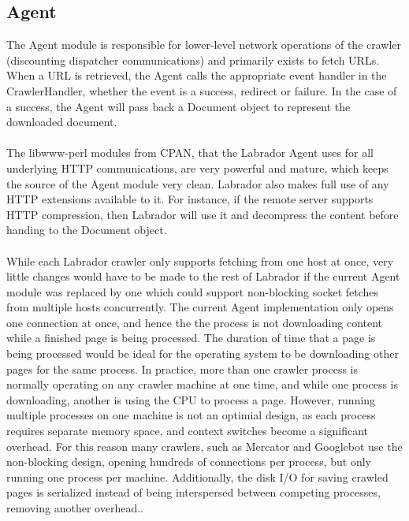 \subsection{Agent}
The Agent module is responsible for lower-level network operations of the crawler (discounting dispatcher communications) and primarily exists to fetch URLs. When a URL is retrieved, the Agent calls the appropriate event handler in the CrawlerHandler, whether the event is a success, redirect or failure. In the case of a success, the Agent will pass back a Document object to represent the downloaded document.\\
\ \\
The libwww-perl modules from CPAN\cite{site1}, that the Labrador Agent uses for all underlying HTTP communications, are very powerful and mature, which keeps the source of the Agent module very clean. Labrador also makes full use of any HTTP extensions available to it. For instance, if the remote server supports HTTP compression, then Labrador will use it and decompress the content before handing to the Document object.\\
\ \\
While each Labrador crawler only supports fetching from one host at once, very little changes would have to be made to the rest of Labrador if the current Agent module was replaced by one which could support non-blocking socket fetches from multiple hosts concurrently. The current Agent implementation only opens one connection at once, and hence the the process is not downloading content while a finished page is being processed. The duration of time that a page is being processed would be ideal for the operating system to be downloading other pages for the same process. In practice, more than one crawler process is normally operating on any crawler machine at one time, and while one process is downloading, another is using the CPU to process a page. However, running multiple processes on one machine is not an optimial design, as each process requires separate memory space, and context switches become a significant overhead. For this reason many crawlers, such as Mercator\cite{ref2} and Googlebot\cite{ref7} use the non-blocking design, opening hundreds of connections per process, but only running one process per machine. Additionally, the disk I/O for saving crawled pages is serialized instead of being interspersed between competing processes, removing another overhead.\cite{book3}.


